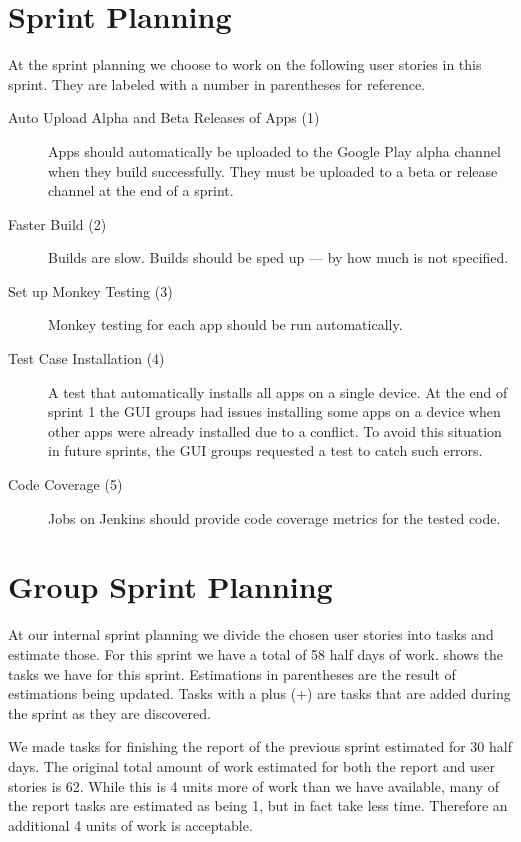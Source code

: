\section{\bdtitle Sprint Planning}\label{sec:S2_bd}
At the \bd sprint planning we choose to work on the following user stories in this sprint. They are labeled with a number in parentheses for reference.

\begin{description}
  \item[Auto Upload Alpha and Beta Releases of Apps (1)] Apps should automatically be uploaded to the Google Play alpha channel when they build successfully. They must be uploaded to a beta or release channel at the end of a sprint.
  \item[Faster Build (2)] Builds are slow. Builds should be sped up --- by how much is not specified.
  \item[Set up Monkey Testing (3)] Monkey testing for each app should be run automatically.
  \item[Test Case Installation (4)] A test that automatically installs all apps on a single device. At the end of sprint 1 the GUI groups had issues installing some apps on a device when other apps were already installed due to a conflict. To avoid this situation in future sprints, the GUI groups requested a test to catch such errors.
  \item[Code Coverage (5)] Jobs on Jenkins should provide code coverage metrics for the tested code.
\end{description}

\section{Group Sprint Planning}\label{sec:S2_group}
At our internal sprint planning we divide the chosen user stories into tasks and estimate those. For this sprint we have a total of 58 half days of work.  shows the tasks we have for this sprint. Estimations in parentheses are the result of estimations being updated. Tasks with a plus (+) are tasks that are added during the sprint as they are discovered.

We made tasks for finishing the report of the previous sprint estimated for 30 half days. The original total amount of work estimated for both the report and user stories is 62. While this is 4 units more of work than we have available, many of the report tasks are estimated as being 1, but in fact take less time. Therefore an additional 4 units of work is acceptable.

